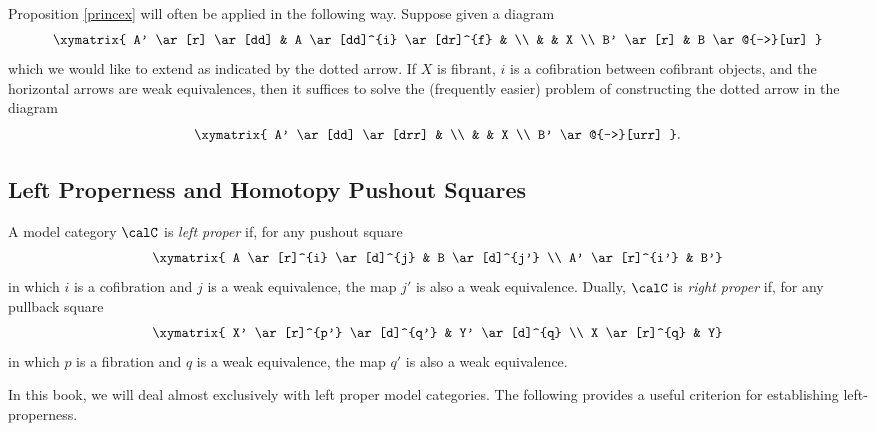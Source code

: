 \begin{Model Categories}
\begin{Already Read}
%
%

Proposition \ref{princex} will often be applied in the following way. Suppose given a diagram
$$ \xymatrix{ A' \ar[r] \ar[dd] & A \ar[dd]^{i} \ar[dr]^{f} & \\
& & X \\
B' \ar[r] & B \ar@{-->}[ur] } $$
which we would like to extend as indicated by the dotted arrow. If $X$ is fibrant, $i$ is a cofibration between cofibrant objects, and the horizontal arrows are weak equivalences, then it suffices
to solve the (frequently easier) problem of constructing the dotted arrow in the diagram
$$ \xymatrix{ A' \ar[dd] \ar[drr] & \\
& & X \\
B' \ar@{-->}[urr] }.$$

\subsection{Left Properness and Homotopy Pushout Squares}\label{hopush}

\begin{definition}
A model category $\calC$ is {\it left proper} if, for any pushout square
$$ \xymatrix{ A \ar[r]^{i} \ar[d]^{j} & B \ar[d]^{j'} \\
A' \ar[r]^{i'} & B'}$$
in which $i$ is a cofibration and $j$ is a weak equivalence, the map $j'$ is also a weak equivalence. Dually, $\calC$ is {\it right proper} if, for any pullback square
$$ \xymatrix{ X' \ar[r]^{p'} \ar[d]^{q'} & Y' \ar[d]^{q} \\
X \ar[r]^{q} & Y}$$
in which $p$ is a fibration and $q$ is a weak equivalence, the map $q'$ is also a weak equivalence.
\end{definition}

In this book, we will deal almost exclusively with left proper model categories. The following provides a useful criterion for establishing left-properness.


\end{Already Read}
\end{Model Categories}
